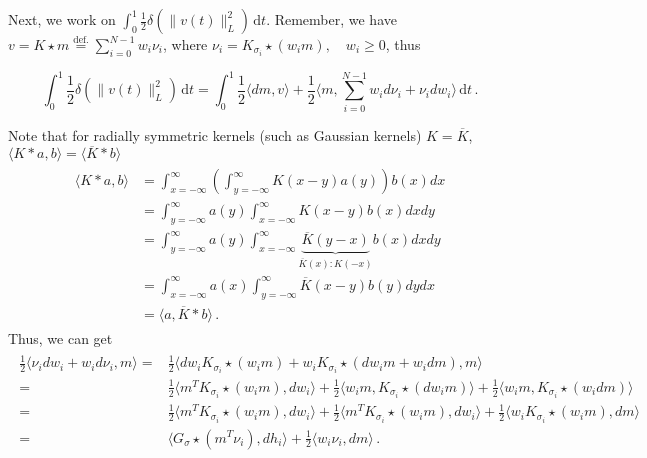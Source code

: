 \documentclass{article}
\numberwithin{equation}{section}
\newcommand{\ud}{\,\mathrm{d}}
\begin{document}
Next, we work on $\int_0^1   \frac 12 \delta( \|v(t) \|^2_L) \ud t$.  Remember,  we have $
v=K \star m \stackrel{\mathrm{def.}}{=} \sum_{i=0}^{N-1} w_{i}\nu_i$, where $ \nu_i = K_{\sigma_i} \star(w_i m), \quad w_{i} \geq 0
$, thus

\begin{equation}\label{eq:decomp_dvK}
\int_0^1   \frac 12 \delta( \|v(t) \|^2_L)\ud t =\int_0^1  \frac 12\langle dm,v\rangle  + \frac 12
\langle m,\sum_{i=0}^{N-1} w_i d\nu_i + \nu_i dw_i  \rangle \ud t\,.
\end{equation}

Note that for radially symmetric kernels (such as Gaussian kernels) $K=\overline{K}$,  $\langle  K * a, b\rangle  = \langle \overline{K} * b\rangle $
\begin{align}
\begin{split}
\langle K * a, b\rangle &=\int_{x=-\infty}^{\infty}\left(\int_{y=-\infty}^{\infty} K(x-y) a(y)\right) b(x) d x \\ &=\int_{y=-\infty}^{\infty} a(y) \int_{x=-\infty}^{\infty} K(x-y) b(x) d x d y \\ &=\int_{y=-\infty}^{\infty} a(y) \int_{x=-\infty}^{\infty} \underbrace{\overline{K}(y-x)}_{\overline{K}(x) : K(-x)} b(x) d x d y \\ &=\int_{x=-\infty}^{\infty} a(x) \int_{y=-\infty}^{\infty} \overline{K}(x-y) b(y) d y d x \\ &=\langle a, \overline{K} * b\rangle\,.
\end{split}
\end{align}
Thus, we can get
\begin{align}\label{eq:decomp_dv_m}
\begin{split}
\frac 12 \langle \nu_i dw_i +  w_i d\nu_i , m \rangle=& \frac 12 \langle  dw_i K_{\sigma_i} \star (w_i m) + w_i K_{\sigma_i} \star (dw_i m + w_i dm),m\rangle \\
=&\frac 12 \langle m^TK_{\sigma_i}\star(w_i m), dw_i\rangle  + \frac 12\langle  w_i m , K_{\sigma_i} \star (dw_i m)\rangle  + \frac 12 \langle  w_i m, K_{\sigma_i} \star (w_i dm)\rangle \\
=&\frac 12  \langle m^T K_{\sigma_i}\star(w_i m), dw_i\rangle  + \frac 12\langle m^T K_{\sigma_i} \star  (w_i m) ,dw_i\rangle  + \frac 12\langle  w_i K_{\sigma_i} \star (w_i m), dm\rangle \\
=&  \langle G_{\sigma}\star(m^T\nu_i), dh_i\rangle  + \frac 12 \langle w_i \nu_i,dm\rangle \,.
\end{split}
\end{align}
\end{document}
